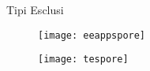 \begin{frame}{Tipi Esclusi}
	\begin{figure}
		\centering\texttt{[image: eeappspore]}
	\end{figure}
	
	\begin{figure}
		\centering\texttt{[image: tespore]}
	\end{figure}
\end{frame}